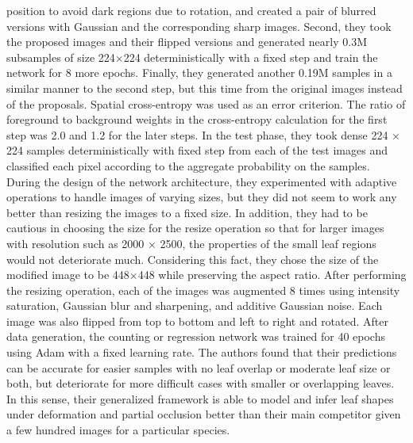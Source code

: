position to avoid dark regions due to rotation, and created a pair of blurred versions with Gaussian and the corresponding sharp images. Second, they took the proposed
images and their flipped versions and generated nearly 0.3M subsamples of size 224×224 deterministically with a fixed step and train the network for 8 more epochs.
Finally, they generated another 0.19M samples in a similar manner to the second step, but this time from the original images instead of the proposals. Spatial
cross-entropy was used as an error criterion. The ratio of foreground to background weights in the cross-entropy calculation for the first step was 2.0 and 1.2
for the later steps. In the test phase, they took dense 224 × 224 samples deterministically with fixed step from each of the test images and classified each pixel
according to the aggregate probability on the samples. During the design of the network architecture, they experimented with adaptive operations to handle images
of varying sizes, but they did not seem to work any better than resizing the images to a fixed size. In addition, they had to be cautious in choosing the size for
the resize operation so that for larger images with resolution such as 2000 × 2500, the properties of the small leaf regions would not deteriorate much. Considering
this fact, they chose the size of the modified image to be 448×448 while preserving the aspect ratio. After performing the resizing operation, each of the images was
augmented 8 times using intensity saturation, Gaussian blur and sharpening, and additive Gaussian noise. Each image was also flipped from top to bottom and left to
right and rotated. After data generation, the counting or regression network was trained for 40 epochs using Adam with a fixed learning rate. The authors found that
their predictions can be accurate for easier samples with no leaf overlap or moderate leaf size or both, but deteriorate for more difficult cases with smaller or overlapping
leaves. In this sense, their generalized framework is able to model and infer leaf shapes under deformation and partial occlusion better than their main competitor given a
few hundred images for a particular species.




